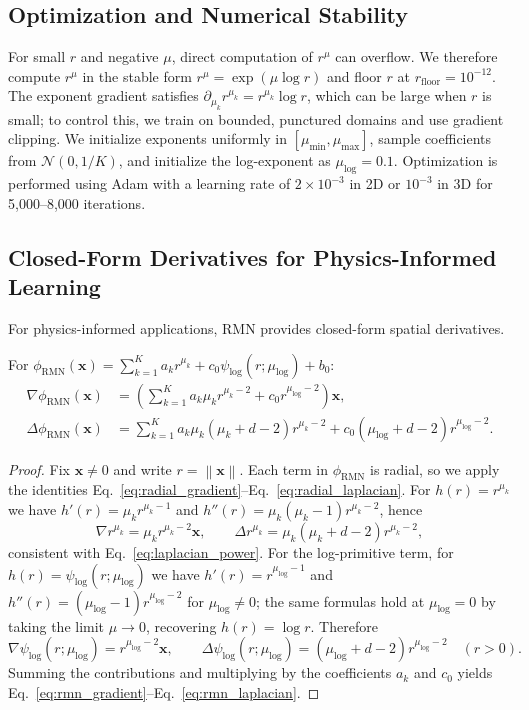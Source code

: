 \documentclass[twoside,11pt]{article}
\newcommand{\bx}{\bm{x}}
\newcommand{\norm}[1]{\left\|#1\right\|}
\renewcommand{\eqref}[1]{Eq.~\ref{#1}}
\begin{document}
\subsection{Optimization and Numerical Stability}
\label{subsec:optimization}

For small $r$ and negative $\mu$, direct computation of $r^\mu$ can overflow. We therefore compute $r^\mu$ in the stable form $r^\mu = \exp(\mu \log r)$ and floor $r$ at $r_{\mathrm{floor}} = 10^{-12}$. The exponent gradient satisfies $\partial_{\mu_k} r^{\mu_k} = r^{\mu_k} \log r$, which can be large when $r$ is small; to control this, we train on bounded, punctured domains and use gradient clipping. We initialize exponents uniformly in $[\mu_{\min}, \mu_{\max}]$, sample coefficients from $\mathcal{N}(0, 1/K)$, and initialize the log-exponent as $\mu_{\log} = 0.1$. Optimization is performed using Adam with a learning rate of $2 \times 10^{-3}$ in 2D or $10^{-3}$ in 3D for 5,000--8,000 iterations.

\subsection{Closed-Form Derivatives for Physics-Informed Learning}
\label{subsec:derivatives}

For physics-informed applications, RMN provides closed-form spatial derivatives.

\begin{proposition}
	For $\phi_{\text{RMN}}(\bx) = \sum_{k=1}^K a_k r^{\mu_k} + c_0 \psi_{\log}(r;\mu_{\log}) + b_0$:
	\begin{align}
		\nabla \phi_{\text{RMN}}(\bx) & = \left( \sum_{k=1}^K a_k \mu_k r^{\mu_k - 2} + c_0 r^{\mu_{\log}-2} \right) \bx, \label{eq:rmn_gradient}                \\
		\Delta \phi_{\text{RMN}}(\bx) & = \sum_{k=1}^K a_k \mu_k (\mu_k + d - 2) r^{\mu_k - 2} + c_0 (\mu_{\log}+d-2) r^{\mu_{\log}-2}. \label{eq:rmn_laplacian}
	\end{align}
\end{proposition}

\begin{proof}
	Fix $\bx \neq 0$ and write $r=\norm{\bx}$. Each term in $\phi_{\text{RMN}}$ is radial, so we apply the identities \eqref{eq:radial_gradient}--\eqref{eq:radial_laplacian}.
	For $h(r)=r^{\mu_k}$ we have $h'(r)=\mu_k r^{\mu_k-1}$ and $h''(r)=\mu_k(\mu_k-1)r^{\mu_k-2}$, hence
	\[
		\nabla r^{\mu_k}=\mu_k r^{\mu_k-2}\bx,
		\qquad
		\Delta r^{\mu_k}=\mu_k(\mu_k+d-2)r^{\mu_k-2},
	\]
	consistent with \eqref{eq:laplacian_power}.
	For the log-primitive term, for $h(r)=\psi_{\log}(r;\mu_{\log})$ we have $h'(r)=r^{\mu_{\log}-1}$ and $h''(r)=(\mu_{\log}-1)r^{\mu_{\log}-2}$ for $\mu_{\log}\neq 0$; the same formulas hold at $\mu_{\log}=0$ by taking the limit $\mu\to 0$, recovering $h(r)=\log r$. Therefore
	\[
		\nabla \psi_{\log}(r;\mu_{\log}) = r^{\mu_{\log}-2}\bx,
		\qquad
		\Delta \psi_{\log}(r;\mu_{\log}) = (\mu_{\log}+d-2)r^{\mu_{\log}-2}
		\quad (r>0).
	\]
	Summing the contributions and multiplying by the coefficients $a_k$ and $c_0$ yields \eqref{eq:rmn_gradient}--\eqref{eq:rmn_laplacian}.
\end{proof}
\end{document}
